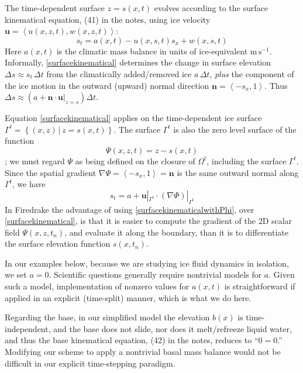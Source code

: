 \documentclass[letterpaper,final,12pt,reqno]{amsart}
\newcommand{\grad}{\nabla}
\newcommand{\bn}{\mathbf{n}}
\newcommand{\bu}{\mathbf{u}}
\begin{document}
The time-dependent surface $z=s(x,t)$ evolves according to the surface kinematical equation, (41) in the notes, using ice velocity $\bu=\left<u(x,z,t),w(x,z,t)\right>$:
\begin{equation}
s_t = a(x,t) - u(x,s,t) s_x + w(x,s,t) \label{surfacekinematical}
\end{equation}
Here $a(x,t)$ is the climatic mass balance in units of ice-equivalent $\text{m}\,\text{s}^{-1}$.  Informally, \eqref{surfacekinematical} determines the change in surface elevation $\Delta s \approx s_t\,\Delta t$ from the climatically added/removed ice $a\,\Delta t$, \emph{plus} the component of the ice motion in the outward (upward) normal direction $\bn = \left<-s_x,1\right>$.  Thus $\Delta s \approx \left(a + \bn\cdot \bu|_{z=s}\right) \Delta t$.

Equation \eqref{surfacekinematical} applies on the time-dependent ice surface $\Gamma^t = \left\{(x,z) \,\big|\, z = s(x,t)\right\}$.  The surface $\Gamma^t$ is also the zero level surface of the function
    $$\Psi(x,z,t) = z - s(x,t)$$
\cite[pp.~65--66]{GreveBlatter2009}; we must regard $\Psi$ as being defined on the closure of $\Omega^t$, including the surface $\Gamma^t$.  Since the spatial gradient $\grad \Psi = \left<-s_x,1\right> = \bn$ is the same outward normal along $\Gamma^t$, we have
\begin{equation}
s_t = a + \bu|_{\Gamma^t} \cdot (\grad \Phi)|_{\Gamma^t}  \label{surfacekinematicalwithPhi}
\end{equation}
In Firedrake the advantage of using \eqref{surfacekinematicalwithPhi}, over \eqref{surfacekinematical}, is that it is easier to compute the gradient of the 2D scalar field $\Psi(x,z,t_n)$, and evaluate it along the boundary, than it is to differentiate the surface elevation function $s(x,t_n)$.

In our examples below, because we are studying ice fluid dynamics in isolation, we set $a=0$.  Scientific questions generally require nontrivial models for $a$.  Given such a model, implementation of nonzero values for $a(x,t)$ is straightforward if applied in an explicit (time-split) manner, which is what we do here.

Regarding the base, in our simplified model the elevation $b(x)$ is time-independent, and the base does not slide, nor does it melt/refreeze liquid water, and thus the base kinematical equation, (42) in the notes, reduces to ``$0=0$.''  Modifying our scheme to apply a nontrivial basal mass balance would not be difficult in our explicit time-stepping paradigm.
\end{document}
